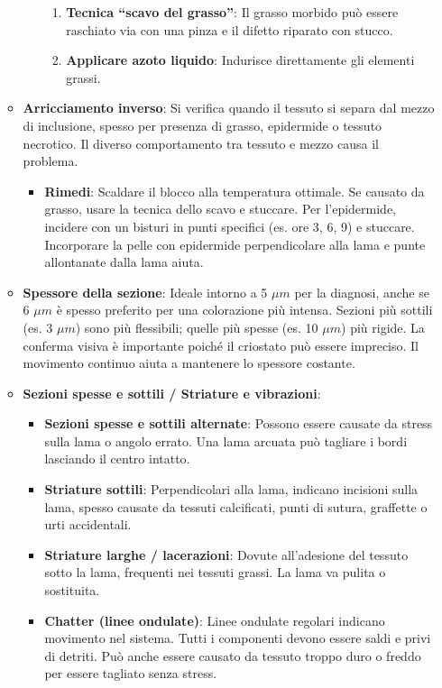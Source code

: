\begin{itemize}
\begin{itemize}
\begin{itemize}
\begin{enumerate}
\item \textbf{Tecnica “scavo del grasso”}: Il grasso morbido può essere raschiato via con una pinza e il difetto riparato con stucco.
\item \textbf{Applicare azoto liquido}: Indurisce direttamente gli elementi grassi.
\end{enumerate}
\end{itemize}
\item \textbf{Arricciamento inverso}: Si verifica quando il tessuto si separa dal mezzo di inclusione, spesso per presenza di grasso, epidermide o tessuto necrotico. Il diverso comportamento tra tessuto e mezzo causa il problema.
\begin{itemize}
\item \textbf{Rimedi}: Scaldare il blocco alla temperatura ottimale. Se causato da grasso, usare la tecnica dello scavo e stuccare. Per l'epidermide, incidere con un bisturi in punti specifici (es. ore 3, 6, 9) e stuccare. Incorporare la pelle con epidermide perpendicolare alla lama e punte allontanate dalla lama aiuta.
\end{itemize}
\item \textbf{Spessore della sezione}: Ideale intorno a 5 $\mu m$ per la diagnosi, anche se 6 $\mu m$ è spesso preferito per una colorazione più intensa. Sezioni più sottili (es. 3 $\mu m$) sono più flessibili; quelle più spesse (es. 10 $\mu m$) più rigide. La conferma visiva è importante poiché il criostato può essere impreciso. Il movimento continuo aiuta a mantenere lo spessore costante.
\item \textbf{Sezioni spesse e sottili / Striature e vibrazioni}:
\begin{itemize}
\item \textbf{Sezioni spesse e sottili alternate}: Possono essere causate da stress sulla lama o angolo errato. Una lama arcuata può tagliare i bordi lasciando il centro intatto.
\item \textbf{Striature sottili}: Perpendicolari alla lama, indicano incisioni sulla lama, spesso causate da tessuti calcificati, punti di sutura, graffette o urti accidentali.
\item \textbf{Striature larghe / lacerazioni}: Dovute all'adesione del tessuto sotto la lama, frequenti nei tessuti grassi. La lama va pulita o sostituita.
\item \textbf{Chatter (linee ondulate)}: Linee ondulate regolari indicano movimento nel sistema. Tutti i componenti devono essere saldi e privi di detriti. Può anche essere causato da tessuto troppo duro o freddo per essere tagliato senza stress.
\end{itemize}
\end{itemize}
\end{itemize}

